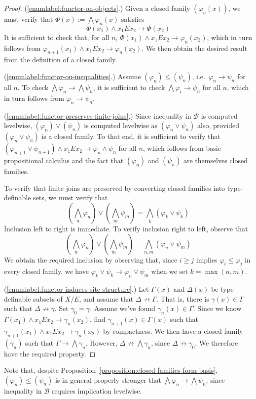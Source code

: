 \documentclass{article}
\theoremstyle{definition}
\newcommand{\B}{\mathcal{B}}
\begin{document}
\begin{proof}
  (\ref{enumlabel:functor-on-objects}.) Given a closed family $(\varphi_n(x))$, we must verify that $\Phi(x) := \bigwedge \varphi_n(x)$ satisfies
  \begin{equation*}
    \Phi(x_1) \wedge x_1 E x_2 \rightarrow \Phi(x_2)
  \end{equation*}
  It is sufficient to check that, for all $n$, $\Phi(x_1) \wedge x_1 E x_2 \rightarrow \varphi_n(x_2)$, which in turn follows from $\varphi_{n+1}(x_1) \wedge x_1 E x_2 \rightarrow \varphi_n(x_2)$. We then obtain the desired result from the definition of a closed family.

  (\ref{enumlabel:functor-on-inequalities}.) Assume $(\varphi_n) \leq (\psi_n)$, i.e.\ $\varphi_n \rightarrow \psi_n$ for all $n$. To check $\bigwedge \varphi_n \rightarrow \bigwedge \psi_n$, it is sufficient to check $\bigwedge \varphi_i \rightarrow \psi_n$ for all $n$, which in turn follows from $\varphi_n \rightarrow \psi_n$.

  (\ref{enumlabel:functor-preserves-finite-joins}.) Since inequality in $\B$ is computed levelwise, $(\varphi_n) \vee (\psi_n)$ is computed levelwise as $(\varphi_n \vee \psi_n)$ also, provided $(\varphi_n \vee \psi_n)$ is a closed family. To that end, it is sufficient to verify that $(\varphi_{n+1} \vee \psi_{n+1}) \wedge x_1 E x_2 \rightarrow \varphi_n \wedge \psi_n$ for all $n$, which follows from basic propositional calculus and the fact that $(\varphi_n)$ and $(\psi_n)$ are themselves closed families.

  To verify that finite joins are preserved by converting closed families into type-definable sets, we must verify that
  \begin{equation*}
    \left(\bigwedge_n \varphi_n\right) \vee \left(\bigwedge_m \psi_m\right) = \bigwedge_k (\varphi_k \vee \psi_k)
  \end{equation*}
  Inclusion left to right is immediate. To verify inclusion right to left, observe that
  \begin{equation*}
    \left(\bigwedge_n \varphi_n\right) \vee \left(\bigwedge_m \psi_m\right) = \bigwedge_{n,m} (\varphi_n \vee \psi_m)
  \end{equation*}
  We obtain the required inclusion by observing that, since $i \geq j$ implies $\varphi_i \leq \varphi_j$ in every closed family, we have $\varphi_k \vee \psi_k \rightarrow \varphi_n \vee \psi_m$ when we set $k = \max(n,m)$.

  (\ref{enumlabel:functor-induces-site-structure}.) Let $\Gamma(x)$ and $\Delta(x)$ be type-definable subsets of $X/E$, and assume that $\Delta \not\rightarrow \Gamma$. That is, there is $\gamma(x) \in \Gamma$ such that $\Delta \not\rightarrow \gamma$. Set $\gamma_0 = \gamma$. Assume we've found $\gamma_n(x) \in \Gamma$. Since we know $\Gamma(x_1) \wedge x_1 E x_2 \rightarrow \gamma_n(x_2)$, find $\gamma_{n+1}(x) \in \Gamma(x)$ such that $\gamma_{n+1}(x_1) \wedge x_1 E x_2 \rightarrow \gamma_n(x_2)$ by compactness. We then have a closed family $(\gamma_n)$ such that $\Gamma \rightarrow \bigwedge \gamma_n$. However, $\Delta \not\rightarrow \bigwedge \gamma_n$, since $\Delta \not\rightarrow \gamma_0$. We therefore have the required property.
\end{proof}

Note that, despite Proposition~\ref{proposition:closed-families-form-basis}, $(\varphi_n) \leq (\psi_n)$ is in general properly stronger that $\bigwedge \varphi_n \rightarrow \bigwedge \psi_n$, since inequality in $\B$ requires implication levelwise.
\end{document}
